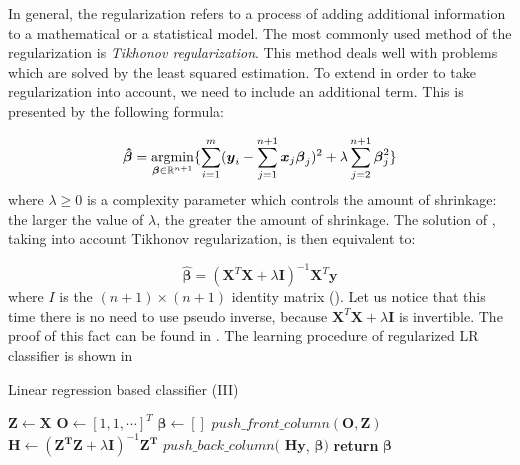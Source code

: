 In general, the regularization refers to a process of adding additional information to a mathematical or a statistical model. The most commonly used method of the regularization is \textit{Tikhonov regularization}. This method deals well with problems which are solved by the least squared estimation. To extend  in order to take regularization into account, we need to include an additional term. This is presented by the following formula:

\begin{equation}\label{eq:LR6}
    \boldsymbol{\hat{\beta}} = \operatorname*{argmin}_{\boldsymbol{\beta} \in \mathbb{R}^{n+1}}\{\sum\limits_{i=1}^{m}(\boldsymbol{y}_{i}-\sum\limits_{j=1}^{n+1}\boldsymbol{x}_j\boldsymbol{\beta}_j)^2+\lambda\sum\limits_{j=2}^{n+1}\boldsymbol{\beta}_j^2\}
\end{equation}
where $\lambda \geq 0$ is a complexity parameter which controls the amount of shrinkage: the larger the value of $\lambda$, the greater the amount of shrinkage.  The solution of , taking into account Tikhonov regularization, is then equivalent to:

\begin{equation}\label{eq:LR7}
    \boldsymbol{\hat{\beta}} = (\boldsymbol{X}^T\boldsymbol{X}+\lambda\boldsymbol{I})^{-1}\boldsymbol{X}^T\boldsymbol{y}
\end{equation}
where $I$ is the $(n+1)\times(n+1)$ identity matrix (\cite{Trevor}). 
Let us notice that this time there is no need to use pseudo inverse, because $\boldsymbol{X}^T\boldsymbol{X}+\lambda\boldsymbol{I}$ is invertible. The proof of this fact can be found in . The learning procedure of regularized LR classifier is shown in 

\begin{algorithm}
    \caption{Linear regression based classifier (III)}\label{alg:LR2}
    \begin{algorithmic}[1]
        \State $\boldsymbol{Z} \gets \boldsymbol{X}$ 
        \State $\boldsymbol{O} \gets [1, 1, \cdots]^T$ 
        \State $\boldsymbol{\beta} \gets []$
        \State $push\_front\_column(\boldsymbol{O}, \boldsymbol{Z})$
        \State $\boldsymbol{H} \gets (\boldsymbol{Z^T}\boldsymbol{Z}+\lambda\boldsymbol{I})^{-1}\boldsymbol{Z^T}$
            \State $push\_back\_column($ $\boldsymbol{H}\boldsymbol{y}$, $\boldsymbol{\beta})$ 
        \EndFor
        \State \textbf{return} $\boldsymbol{\beta}$
    \EndFunction
    \end{algorithmic}
\end{algorithm}

